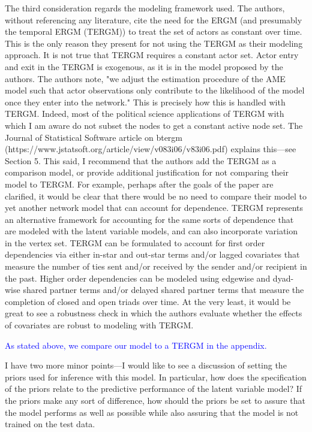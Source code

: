 \documentclass[12pt,onesided,fullpage]{amsart}
\begin{document}
The third consideration regards the modeling framework used. The authors, without referencing any literature, cite the need for the ERGM (and presumably the temporal ERGM (TERGM)) to treat the set of actors as constant over time. This is the only reason they present for not using the TERGM as their modeling approach. It is not true that TERGM requires a constant actor set. Actor entry and exit in the TERGM is exogenous, as it is in the model proposed by the authors. The authors note, "we adjust the estimation procedure of the AME model such that actor observations only contribute to the likelihood of the model once they enter into the network." This is precisely how this is handled with TERGM. Indeed, most of the political science applications of TERGM with which I am aware do not subset the nodes to get a constant active node set. The Journal of Statistical Software article on btergm (https://www.jstatsoft.org/article/view/v083i06/v83i06.pdf) explains this---see Section 5.
This said, I recommend that the authors add the TERGM as a comparison model, or provide additional justification for not comparing their model to TERGM. For example, perhaps after the goals of the paper are clarified, it would be clear that there would be no need to compare their model to yet another network model that can account for dependence. TERGM represents an alternative framework for accounting for the same sorts of dependence that are modeled with the latent variable models, and can also incorporate variation in the vertex set. TERGM can be formulated to account for first order dependencies via either in-star and out-star terms and/or lagged covariates that measure the number of ties sent and/or received by the sender and/or recipient in the past. Higher order dependencies can be modeled using edgewise and dyad-wise shared partner terms  and/or delayed shared partner terms that measure the completion of closed and open triads over time. At the very least, it would
be great to see a robustness check in which the authors evaluate whether the effects of covariates are robust to modeling with TERGM.

\textcolor{blue}{As stated above, we compare our model to a TERGM in the appendix.}

I have two more minor points---I would like to see a discussion of setting the priors used for inference with this model. In particular, how does the specification of the priors relate to the predictive performance of the latent variable model? If the priors make any sort of difference, how should the priors be set to assure that the model performs as well as possible while also assuring that the model is not trained on the test data. 
\end{document}
